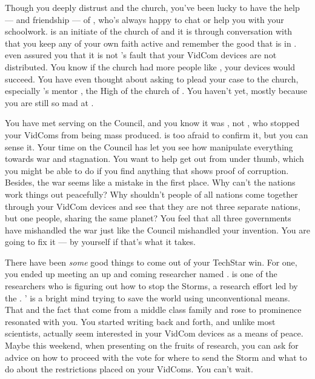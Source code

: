 \documentclass[char]{GL2020}
\begin{document}
Though you deeply distrust \cAntiChup{} and the church, you've been lucky to have the help — and friendship — of \cScholarship{\full}, who's always happy to chat or help you with your schoolwork. \cScholarship{} is an initiate of the church of \cTechGod{} and it is through conversation with \cScholarship{\them} that you keep any of your own faith active and remember the good that is in \cTechGod{}. \cScholarship{\Theyhave} even assured you that it is not \cTechGod{}’s fault that your VidCom devices are not distributed. You know if the church had more people like \cScholarship{}, your devices would succeed. You have even thought about asking \cScholarship{\them} to plead your case to the church, especially \cScholarship{}’s mentor \cAntiChup{}, the High \cAntiChup{\Cleric} of the church of \cTechGod{}. You haven’t yet, mostly because you are still so mad at \cAntiChup{}.

You have met \cAntiChup{\them} serving on the Council, and you know it was \cAntiChup{\them}, not \cTechGod{}, who stopped your VidComs from being mass produced. \cScholarship{} is too afraid to confirm it, but you can sense it. Your time on the Council has let you see how \cAntiChup{\they} manipulate\cAntiChup{\verbs} everything towards war and stagnation. You want to help \cScholarship{} get out from under \cAntiChup{\their} thumb, which you might be able to do if you find anything that shows proof of \cAntiChup{\their} corruption. Besides, the war seems like a mistake in the first place. Why can't the nations work things out peacefully? Why shouldn't people of all nations come together through your VidCom devices and see that they are not three separate nations, but one people, sharing the same planet? You feel that all three governments have mishandled the war just like the Council mishandled your invention. You are going to fix it — by yourself if that's what it takes.

There have been \emph{some} good things to come out of your TechStar win. For one, you ended up meeting an up and coming researcher named \cAssistantScientist{\full}.  \cAssistantScientist{} is one of the researchers who is figuring out how to stop the Storms, a research effort led by the \pTech{}. \cAssistantScientist{}’ is a bright mind trying to save the world using unconventional means. That and the fact that \cAssistantScientist{\they} come\cAssistantScientist{\verbs} from a middle class family and rose to prominence resonated with you. You started writing back and forth, and unlike most scientists, \cAssistantScientist{\they} actually seem\cAssistantScientist{\verbs} interested in your VidCom devices as a means of peace. Maybe this weekend, when \cAssistantScientist{\theyare} presenting on the fruits of \cAssistantScientist{\their} research, you can ask for advice on how to proceed with the vote for where to send the Storm and what to do about the restrictions placed on your VidComs. You can’t wait.  
\end{document}
